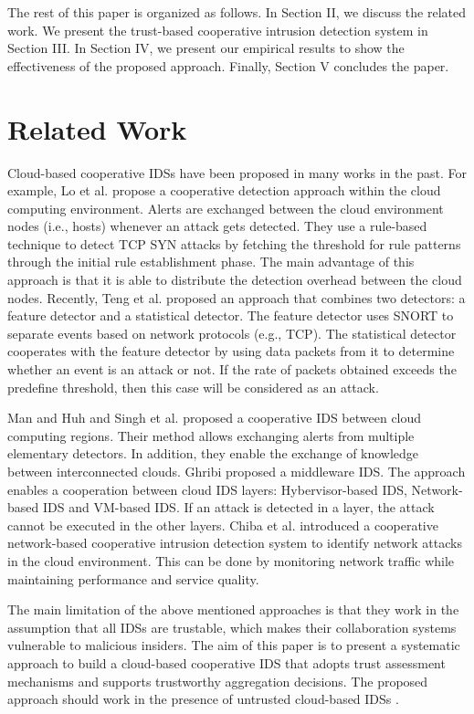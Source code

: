 \documentclass[conference]{IEEEtran}
\begin{document}
The rest of this paper is organized as follows. In Section II, we discuss the related work. We present the trust-based cooperative intrusion detection system in Section III. In Section IV, we present our empirical results to show the effectiveness of the proposed approach. Finally, Section V concludes the paper.


\section{Related Work}

Cloud-based cooperative IDSs have been proposed in many works in the past. For example, Lo et al. \cite{lo2010cooperative} propose a cooperative detection approach within the cloud computing environment. Alerts are exchanged between the cloud environment nodes (i.e., hosts) whenever an attack gets detected. They use a rule-based technique to detect TCP SYN attacks by fetching the threshold for rule patterns through the initial rule establishment phase. The main advantage of this approach is that it is able to distribute the detection overhead between the cloud nodes. Recently, Teng et al. \cite{teng2014cooperative} proposed an approach that combines two detectors: a feature detector and a statistical detector. The feature detector uses SNORT to separate events based on network protocols (e.g., TCP). The statistical detector cooperates with the feature detector by using data packets from it to determine whether an event is an attack or not. If the rate of packets obtained exceeds the predefine threshold, then this case will be considered as an attack.

Man and Huh \cite{man2012collaborative} and Singh et al. \cite{singh2016collaborative} proposed a cooperative IDS between cloud computing regions. Their method allows exchanging alerts from multiple elementary detectors. In addition, they enable the exchange of knowledge between interconnected clouds. Ghribi \cite{ghribi2016distributed}  proposed a  middleware IDS. The approach enables a cooperation between cloud IDS layers: Hybervisor-based IDS, Network-based IDS and VM-based IDS. If an attack is detected in a layer, the attack cannot be executed in the other layers. Chiba et al. \cite{chiba2016cooperative}  introduced a cooperative network-based cooperative intrusion detection system to identify network attacks in the cloud environment. This can be done by monitoring network traffic while maintaining performance and service quality.

The main limitation of the above mentioned approaches is that they work in the assumption that all IDSs are trustable, which makes their collaboration systems vulnerable to malicious insiders. The aim of this paper is to present a systematic approach to build a cloud-based cooperative IDS that adopts trust assessment mechanisms and supports trustworthy aggregation decisions. The proposed approach should work in the presence of untrusted cloud-based IDSs .
\end{document}
